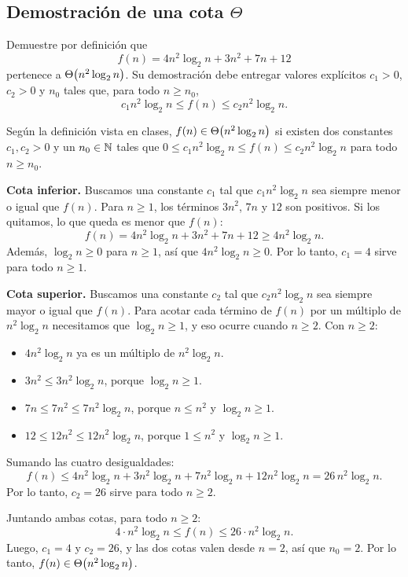 \subsection{Demostración de una cota \texorpdfstring{$\Theta$}{Theta}}
\label{sec:act2-1}

\begin{enunciado}
Demuestre por definición que
\[
  f(n) = 4n^2 \log_2 n + 3n^2 + 7n + 12
\]
pertenece a $\Theta\!\left(n^2 \log_2 n\right)$. Su demostración debe entregar valores explícitos
$c_1 > 0$, $c_2 > 0$ y $n_0$ tales que, para todo $n \ge n_0$,
\[
  c_1 n^2 \log_2 n \le f(n) \le c_2 n^2 \log_2 n.
\]
\end{enunciado}

Según la definición vista en clases, $f(n) \in \Theta\!\left(n^2 \log_2 n\right)$ si existen dos
constantes $c_1, c_2 > 0$ y un $n_0 \in \mathbb{N}$ tales que
$0 \le c_1 n^2 \log_2 n \le f(n) \le c_2 n^2 \log_2 n$ para todo $n \ge n_0$.

\textbf{Cota inferior.} Buscamos una constante $c_1$ tal que $c_1 n^2 \log_2 n$ sea
siempre menor o igual que $f(n)$. Para $n \ge 1$, los términos $3n^2$, $7n$ y $12$ son
positivos. Si los quitamos, lo que queda es menor que $f(n)$:
\[
  f(n) = 4n^2 \log_2 n + 3n^2 + 7n + 12 \ge 4n^2 \log_2 n.
\]
Además, $\log_2 n \ge 0$ para $n \ge 1$, así que $4n^2 \log_2 n \ge 0$. Por lo tanto,
$c_1 = 4$ sirve para todo $n \ge 1$.

\textbf{Cota superior.} Buscamos una constante $c_2$ tal que $c_2 n^2 \log_2 n$ sea siempre
mayor o igual que $f(n)$. Para acotar cada término de $f(n)$ por un múltiplo de
$n^2 \log_2 n$ necesitamos que $\log_2 n \ge 1$, y eso ocurre cuando $n \ge 2$.
Con $n \ge 2$:
\begin{itemize}
  \item $4n^2 \log_2 n$ ya es un múltiplo de $n^2 \log_2 n$.
  \item $3n^2 \le 3n^2 \log_2 n$, porque $\log_2 n \ge 1$.
  \item $7n \le 7n^2 \le 7n^2 \log_2 n$, porque $n \le n^2$ y $\log_2 n \ge 1$.
  \item $12 \le 12n^2 \le 12n^2 \log_2 n$, porque $1 \le n^2$ y $\log_2 n \ge 1$.
\end{itemize}
Sumando las cuatro desigualdades:
\[
  f(n) \le 4n^2 \log_2 n + 3n^2 \log_2 n + 7n^2 \log_2 n + 12n^2 \log_2 n
       = 26\, n^2 \log_2 n.
\]
Por lo tanto, $c_2 = 26$ sirve para todo $n \ge 2$.

Juntando ambas cotas, para todo $n \ge 2$:
\[
  4 \cdot n^2 \log_2 n \le f(n) \le 26 \cdot n^2 \log_2 n.
\]
Luego, $c_1 = 4$ y $c_2 = 26$, y las dos cotas valen desde $n = 2$, así que $n_0 = 2$. Por
lo tanto, $f(n) \in \Theta\!\left(n^2 \log_2 n\right)$.

